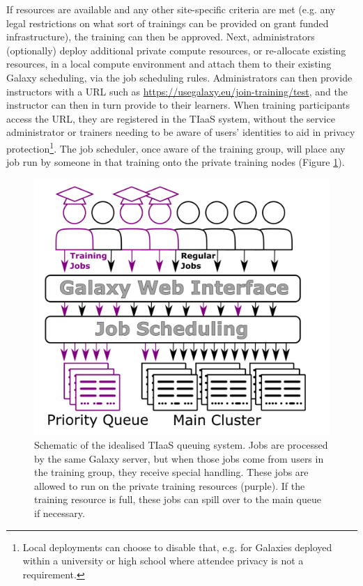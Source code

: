 \documentclass[a4paper,num-refs]{oup-contemporary}
\begin{document}
If resources are available and any other site-specific criteria are met (e.g. any legal restrictions on what sort of trainings can be provided on grant funded infrastructure), the training can then be approved. Next, administrators (optionally) deploy additional private compute resources, or re-allocate existing resources, in a local compute environment and attach them to their existing Galaxy scheduling, via the job scheduling rules. Administrators can then provide instructors with a URL such as \url{https://usegalaxy.eu/join-training/test}, and the instructor can then in turn provide to their learners. When training participants access the URL, they are registered in the TIaaS system, without the service administrator or trainers needing to be aware of users' identities to aid in privacy protection\footnote{Local deployments can choose to disable that, e.g. for Galaxies deployed within a university or high school where attendee privacy is not a requirement.}. The job scheduler, once aware of the training group, will place any job run by someone in that training onto the private training nodes (Figure \ref{figure:queue}).

\begin{figure}[bt!]
\centering
\includegraphics[width=\linewidth]{images/rules.png}
\caption{Schematic of the idealised TIaaS queuing system. Jobs are processed by the same Galaxy server, but when those jobs come from users in the training group, they receive special handling. These jobs are allowed to run on the private training resources (purple). If the training resource is full, these jobs can spill over to the main queue if necessary.}\label{figure:queue}
\end{figure}
\end{document}
